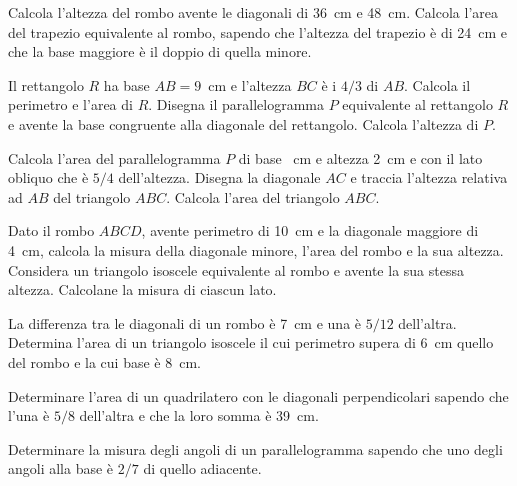 \begin{multicols}{2}
\begin{esercizio}
\label{ese:7.47}
Calcola l'altezza del rombo avente le diagonali di 36~cm e 48~cm. 
Calcola l'area del trapezio equivalente al rombo, sapendo che 
l'altezza del trapezio è di 24~cm e che la base maggiore è il doppio 
di quella minore.
\end{esercizio}

\begin{esercizio}
\label{ese:7.48}
Il rettangolo $R$ ha base $AB = 9$~cm e l'altezza $BC$ è i $4/3$ di 
$AB$. Calcola il perimetro e l'area di $R$. Disegna il 
parallelogramma $P$ equivalente al rettangolo $R$ e avente la base 
congruente alla diagonale del rettangolo. Calcola l'altezza di $P$.
\end{esercizio}

\begin{esercizio}
\label{ese:7.49}
Calcola l'area del parallelogramma $P$ di base ~cm e altezza 
2~cm e con il lato obliquo che è $5/4$ dell'altezza. Disegna la 
diagonale $AC$ e traccia l'altezza relativa ad $AB$ del triangolo 
$ABC$. Calcola l'area del triangolo $ABC$.
\end{esercizio}

\begin{esercizio}
\label{ese:7.51}
Dato il rombo $ABCD$, avente perimetro di 10~cm e la diagonale 
maggiore di 4~cm, calcola la misura della diagonale minore, l'area 
del rombo e la sua altezza. Considera un triangolo isoscele 
equivalente al rombo e avente la sua stessa altezza. Calcolane la 
misura di ciascun lato.
\end{esercizio}

\begin{esercizio}
\label{ese:7.58}
La differenza tra le diagonali di un rombo è 7~cm e una è $5/12$ 
dell'altra. Determina l'area di un triangolo isoscele il cui 
perimetro supera di 6~cm quello del rombo e la cui base è 8~cm.
\end{esercizio}

\begin{esercizio}
\label{ese:7.59}
Determinare l'area di un quadrilatero con le diagonali perpendicolari 
sapendo che l'una è $5/8$ dell'altra e che la loro somma è 39~cm.
\end{esercizio}

\begin{esercizio}
\label{ese:7.60}
Determinare la misura degli angoli di un parallelogramma sapendo che 
uno degli angoli alla base è $2/7$ di quello adiacente.
\end{esercizio}


\end{multicols}
